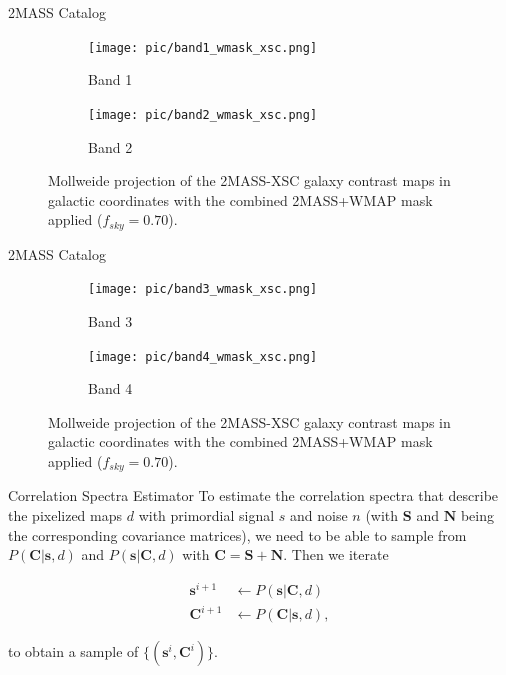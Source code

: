 \documentclass[serif, aspectratio=169]{beamer}
\begin{document}
\begin{frame}{2MASS Catalog}
    \begin{figure}
     \centering
     \begin{subfigure}[t]{0.49\textwidth}
         \centering
         \texttt{[image: pic/band1\_wmask\_xsc.png]}
         \caption{Band 1}
         \label{fig:contrast_map1}
     \end{subfigure}
     \hfill
     \begin{subfigure}[t]{0.49\textwidth}
         \centering
         \texttt{[image: pic/band2\_wmask\_xsc.png]}
         \caption{Band 2}
         \label{fig:contrast_map2}
     \end{subfigure}
     \caption{Mollweide projection of the 2MASS-XSC galaxy contrast maps in galactic coordinates with the combined 2MASS+WMAP mask applied ($f_{sky}=0.70$).}
        \label{fig:2MASS_maps1}
      \end{figure}
\end{frame}

\begin{frame}{2MASS Catalog}
    \begin{figure}
    \centering
        \begin{subfigure}[b]{0.49\textwidth}
             \centering
             \texttt{[image: pic/band3\_wmask\_xsc.png]}
             \caption{Band 3}
             \label{fig:contrast_map3}
        \end{subfigure}
        \hfill
        \begin{subfigure}[b]{0.49\textwidth}
             \centering
             \texttt{[image: pic/band4\_wmask\_xsc.png]}
             \caption{Band 4}
             \label{fig:contrast_map4}
        \end{subfigure}
    \caption{Mollweide projection of the 2MASS-XSC galaxy contrast maps in galactic coordinates with the combined 2MASS+WMAP mask applied ($f_{sky}=0.70$).}
    \label{fig:2MASS_maps2}
    \end{figure}
\end{frame}

\begin{frame}{Correlation Spectra Estimator}
    To estimate the correlation spectra that describe the pixelized maps $d$ with primordial signal $s$ and noise $n$ (with $\mathbf{S}$ and $\mathbf{N}$ being the corresponding covariance matrices), we need to be able to sample from $P(\mathbf{C}|\mathbf{s},d)$ and $P(\mathbf{s}|\mathbf{C},d)$ with $\mathbf{C}=\mathbf{S}+\mathbf{N}$. Then we iterate

    \begin{align}
        \mathbf{s}^{i+1}&\leftarrow P(\mathbf{s}|\mathbf{C},d)\\
        \mathbf{C}^{i+1}&\leftarrow P(\mathbf{C}|\mathbf{s},d),
    \end{align}

    to obtain a sample of $\{(\mathbf{s}^i, \mathbf{C}^i)\}$.
\end{frame}
\end{document}
